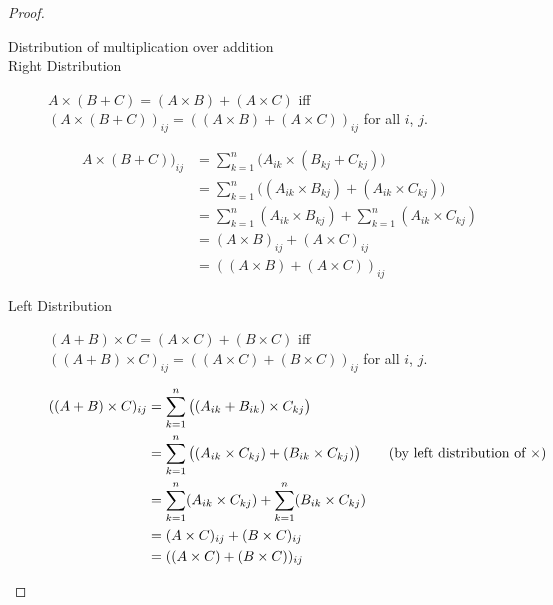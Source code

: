 \documentclass[runningheads]{llncs}
\renewcommand{\oplus}{+}
\renewcommand{\otimes}{\times}
\begin{document}
\begin{proof}
\begin{description}
\begin{description}
				\item [Distribution of multiplication over addition]
				\item[Right Distribution]
					\(A \otimes (B \oplus C) = (A \otimes B) \oplus (A \otimes C)\) iff \((A \otimes (B \oplus C))_{ij} = ((A \otimes B) \oplus (A \otimes C))_{ij}\) for all \(i\), \(j\).

					\begin{align*}
						A \otimes (B \oplus C))_{ij} & = \sum_{k=1}^{n} \big( A_{ik} \times (B_{kj} + C_{kj})\big)                                                            \\
						                             & = \sum_{k=1}^{n} \big((A_{ik} \times B_{kj}) + ( A_{ik} \times C_{kj})\big) \tag{by right distribution of \(\times \)} \\
						                             & = \sum_{k=1}^{n} (A_{ik} \times B_{kj}) + \sum_{k=1}^{n} (A_{ik} \times C_{kj})                                        \\
						                             & = (A \otimes B)_{ij} + (A \otimes C)_{ij}                                                                              \\
						                             & = ((A \otimes B) \oplus (A \otimes C))_{ij}
					\end{align*}

				\item[Left Distribution]
					\((A \oplus B) \otimes C = (A \otimes C) \oplus ( B \otimes C)\) iff \(((A \oplus B) \otimes C)_{ij} = ((A \otimes C)\oplus ( B \otimes C))_{ij}\) for all \(i\), \(j\).

					\begin{align*}
						((A \oplus B) \otimes C)_{ij} & = \sum_{k=1}^{n} \big( (A_{ik} + B_{ik}) \times C_{kj} \big)                                                           \\
						                              & = \sum_{k=1}^{n} \big( (A_{ik} \times C_{kj}) + ( B_{ik} \times C_{kj})\big) \tag{by left distribution of \(\times \)} \\
						                              & = \sum_{k=1}^{n} (A_{ik} \times C_{kj}) + \sum_{k=1}^{n} (B_{ik} \times C_{kj})                                        \\
						                              & = (A \otimes C)_{ij} + (B \otimes C)_{ij}                                                                              \\
						                              & = ((A \otimes C) \oplus (B \otimes C))_{ij}
						\qedhere
					\end{align*}
			\end{description}
	\end{description}
\end{proof}
\end{document}
